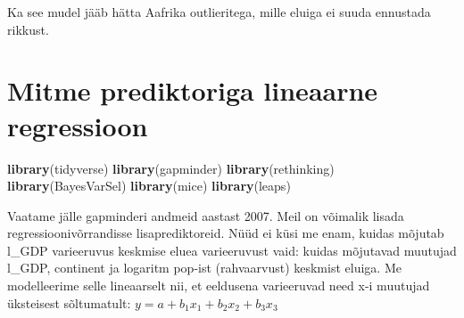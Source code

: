 \documentclass[]{book}
\newenvironment{Shaded}{\begin{snugshade}}{\end{snugshade}}
\newcommand{\DataTypeTok}[1]{\textcolor[rgb]{0.13,0.29,0.53}{#1}}
\newcommand{\DecValTok}[1]{\textcolor[rgb]{0.00,0.00,0.81}{#1}}
\newcommand{\KeywordTok}[1]{\textcolor[rgb]{0.13,0.29,0.53}{\textbf{#1}}}
\newcommand{\NormalTok}[1]{#1}
\newcommand{\OperatorTok}[1]{\textcolor[rgb]{0.81,0.36,0.00}{\textbf{#1}}}
\newcommand{\StringTok}[1]{\textcolor[rgb]{0.31,0.60,0.02}{#1}}
\begin{document}
Ka see mudel jääb hätta Aafrika outlieritega, mille eluiga ei suuda ennustada rikkust.

\hypertarget{mitme-prediktoriga-lineaarne-regressioon}{%
\chapter{Mitme prediktoriga lineaarne regressioon}\label{mitme-prediktoriga-lineaarne-regressioon}}

\begin{Shaded}
\begin{Highlighting}[]
\KeywordTok{library}\NormalTok{(tidyverse)}
\KeywordTok{library}\NormalTok{(gapminder)}
\KeywordTok{library}\NormalTok{(rethinking)}
\KeywordTok{library}\NormalTok{(BayesVarSel)}
\KeywordTok{library}\NormalTok{(mice)}
\KeywordTok{library}\NormalTok{(leaps)}
\end{Highlighting}
\end{Shaded}

Vaatame jälle gapminderi andmeid aastast 2007.
Meil on võimalik lisada regressioonivõrrandisse lisaprediktoreid.
Nüüd ei küsi me enam, kuidas mõjutab l\_GDP varieeruvus keskmise eluea varieeruvust vaid: kuidas mõjutavad muutujad l\_GDP, continent ja logaritm pop-ist (rahvaarvust) keskmist eluiga.
Me modelleerime selle lineaarselt nii, et eeldusena varieeruvad need x-i muutujad üksteisest sõltumatult: \(y = a + b_1x_1 + b_2x_2 + b_3x_3\)

\begin{Shaded}
\end{Shaded}
\end{document}
